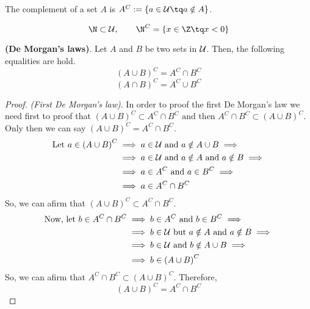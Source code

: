 \begin{definition}
    The complement of a set $A$ is $A^C:=\{a\in\uset\tq a\notin A\}$.
\end{definition}
\begin{example}[Let $\uset = \Z$.]
    \begin{equation}
        \N\subset\uset, \quad\quad\N^C = \{x\in\Z\tq x<0\}
    \end{equation}
\end{example}

\begin{definition}
\textbf{(De Morgan's laws)}. Let $A$ and $B$ be two sets in $\mathcal{U}$. Then, the following equalities are hold.
\begin{equation}\label{demorgan:1}
    \left( A\cup B \right)^C = A^C\cap B^C
\end{equation}
\begin{equation}\label{demorgan:2}
    \left( A\cap B \right)^C = A^C\cup B^C 
\end{equation}
\end{definition}
\begin{proof}
    \textit{(First De Morgan's law)}. In order to proof the first De Morgan's law we need first to proof that $\left( A\cup B \right)^C\subset A^C\cap B^C \textrm{ and then } A^C\cap B^C \subset \left(  A\cup B\right)^C$. Only then we can say $\left( A\cup B \right)^C = A^C\cap B^C $. 
    \begin{align}
        \textrm{Let } a\in\left( A\cup B \right)^C &\implies a\in\mathcal{U}\textrm{ and } a\notin A\cup B \implies \\
                                     &\implies a\in\mathcal{U}\textrm{ and } a\notin A\textrm{ and } a\notin B \implies \\ &\implies a\in A^C\textrm{ and } a\in B^C \implies \\
                                                         &\implies a\in A^C\cap B^C
    \end{align}
    So, we can afirm that $\left( A\cup B \right)^C \subset A^C\cap B^C $.
    \begin{align}
        \textrm{Now, let } b\in A^C\cap B^C &\implies b\in A^C\textrm{ and } b\in B^C \implies \\
                                            &\implies b\in\mathcal{U}\textrm{ but } a\notin A\textrm{ and } a\notin B \implies \\ &\implies b\in\mathcal{U}\textrm{ and } b\notin A\cup B \implies \\
                                            &\implies b\in \left( A\cup B \right)^C
    \end{align}
    So, we can afirm that $A^C\cap B^C\subset\left( A\cup B \right)^C $. Therefore,
    \begin{equation}
        \left( A\cup B \right)^C = A^C\cap B^C
    \end{equation}

\end{proof}

